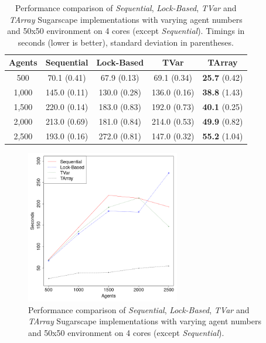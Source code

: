 \begin{table}
	\centering
  	\begin{tabular}{ c || c | c | c | c }
        Agents  & Sequential    & Lock-Based    & TVar          & TArray                \\ \hline \hline 
    	    500     & 70.1 (0.41)   & 67.9 (0.13)   & 69.1 (0.34)   & \textbf{25.7} (0.42)  \\ \hline
   		1,000   & 145.0 (0.11)  & 130.0 (0.28)  & 136.0 (0.16)  & \textbf{38.8} (1.43)  \\ \hline
   		1,500   & 220.0 (0.14)  & 183.0 (0.83)  & 192.0 (0.73)  & \textbf{40.1} (0.25)  \\ \hline
   		2,000   & 213.0 (0.69)  & 181.0 (0.84)  & 214.0 (0.53)  & \textbf{49.9} (0.82)  \\ \hline
   		2,500   & 193.0 (0.16)  & 272.0 (0.81)  & 147.0 (0.32)  & \textbf{55.2} (1.04)  \\ \hline \hline
   	\end{tabular}
  	
  	\caption[Performance comparison of \textit{Sequential}, \textit{Lock-Based}, \textit{TVar} and \textit{TArray} Sugarscape implementations with varying agent numbers and 50x50 environment on 4 cores (except \textit{Sequential})]{Performance comparison of \textit{Sequential}, \textit{Lock-Based}, \textit{TVar} and \textit{TArray} Sugarscape implementations with varying agent numbers and 50x50 environment on 4 cores (except \textit{Sequential}). Timings in seconds (lower is better), standard deviation in parentheses.}
	\label{tab:sugarscape_varyingagents_constcores}
\end{table}

\begin{figure}
	\centering
	\includegraphics[width=0.6\textwidth, angle=0]{./fig/concurrentabs/sugarscape/sugarscape_varyingagents_constcores.png}
	\caption{Performance comparison of \textit{Sequential}, \textit{Lock-Based}, \textit{TVar} and \textit{TArray} Sugarscape implementations with varying agent numbers and 50x50 environment on 4 cores (except \textit{Sequential}).}
	\label{fig:sugarscape_varyingagents_constcores}
\end{figure}

